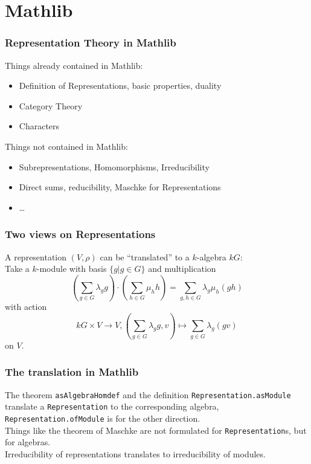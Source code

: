 \documentclass{beamer}
\begin{document}

\section{Mathlib}
\begin{frame}
\frametitle{Representation Theory in Mathlib}
Things already contained in Mathlib:
\begin{itemize}
\item Definition of Representations, basic properties, duality
\item Category Theory
\item Characters
\end{itemize}
\pause
Things not contained in Mathlib:
\begin{itemize}
\item Subrepresentations, Homomorphisms, Irreducibility
\item Direct sums, reducibility, Maschke for Representations
\item \ldots
\end{itemize}
\end{frame}


\begin{frame}
\frametitle{Two views on Representations}
A representation \((V, \rho)\) can be \enquote{translated} to a \(k\)-algebra \(kG\):\\
\pause
Take a \(k\)-module with basis \(\{g\vert g\in G\}\) and multiplication
\begin{equation*}
\left(\sum_{g\in G}\lambda_g g\right)\cdot \left(\sum_{h\in G}\mu_h h\right) = \sum_{g,h\in G} \lambda_g\mu_h (gh)
\end{equation*}
\pause
with action
\begin{equation*}
kG\times V\to V, \left(\sum_{g\in G}\lambda_gg, v\right) \mapsto \sum_{g\in G}\lambda_g(gv)
\end{equation*}
on \(V\).
\end{frame}


\begin{frame}[fragile]
\frametitle{The translation in Mathlib}
The theorem \verb+asAlgebraHomdef+ and the definition \verb+Representation.asModule+ translate a \verb+Representation+ to the corresponding algebra, \verb+Representation.ofModule+ is for the other direction.\\
\pause
\vspace{1cm}
Things like the theorem of Maschke are not formulated for \verb+Representation+s, but for algebras.\\
\pause
Irreducibility of representations translates to irreducibility of modules.
\end{frame}
\end{document}
